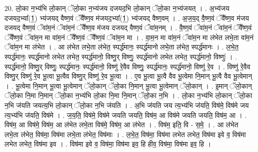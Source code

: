 \documentclass[17pt]{extarticle}
\begin{document}
20. लो॒का न॒भ्य॑भि लो॒कान् ॅलो॒का न॒भ्य॑जय दजयद॒भि लो॒कान् ॅलो॒का न॒भ्य॑जयत् । . अ॒भ्य॑जय दजयद॒भ्या᳚(1॒) भ्य॑जयद् वैष्ण॒वं ॅवै᳚ष्ण॒व म॑जयद॒भ्या᳚(1॒) भ्य॑जयद् वैष्ण॒वम् । . अ॒ज॒य॒द् वै॒ष्ण॒वं ॅवै᳚ष्ण॒व म॑जय दजयद् वैष्ण॒वं ॅवा॑म॒नं ॅवा॑म॒नं ॅवै᳚ष्ण॒व म॑जय दजयद् वैष्ण॒वं ॅवा॑म॒नम् । . वै॒ष्ण॒वं ॅवा॑म॒नं ॅवा॑म॒नं ॅवै᳚ष्ण॒वं ॅवै᳚ष्ण॒वं ॅवा॑म॒न मा वा॑म॒नं ॅवै᳚ष्ण॒वं ॅवै᳚ष्ण॒वं ॅवा॑म॒न मा । . वा॒म॒न मा वा॑म॒नं ॅवा॑म॒न मा ल॑भेत लभे॒ता वा॑म॒नं ॅवा॑म॒न मा ल॑भेत । . आ ल॑भेत लभे॒ता ल॑भेत॒ स्पर्द्ध॑मानः॒ स्पर्द्ध॑मानो लभे॒ता ल॑भेत॒ स्पर्द्ध॑मानः । . ल॒भे॒त॒ स्पर्द्ध॑मानः॒ स्पर्द्ध॑मानो लभेत लभेत॒ स्पर्द्ध॑मानो॒ विष्णु॒र् विष्णुः॒ स्पर्द्ध॑मानो लभेत लभेत॒ स्पर्द्ध॑मानो॒ विष्णुः॑ । . स्पर्द्ध॑मानो॒ विष्णु॒र् विष्णुः॒ स्पर्द्ध॑मानः॒ स्पर्द्ध॑मानो॒ विष्णु॑ रे॒वैव विष्णुः॒ स्पर्द्ध॑मानः॒ स्पर्द्ध॑मानो॒ विष्णु॑ रे॒व । . विष्णु॑ रे॒वैव विष्णु॒र् विष्णु॑ रे॒व भू॒त्वा भू॒त्वैव विष्णु॒र् विष्णु॑ रे॒व भू॒त्वा । . ए॒व भू॒त्वा भू॒त्वै वैव भू॒त्वेमा नि॒मान् भू॒त्वै वैव भू॒त्वेमान् । . भू॒त्वेमा नि॒मान् भू॒त्वा भू॒त्वेमान् ॅलो॒कान् ॅलो॒का नि॒मान् भू॒त्वा भू॒त्वेमान् ॅलो॒कान् । . इ॒मान् ॅलो॒कान् ॅलो॒का नि॒मा नि॒मान् ॅलो॒का न॒भ्य॑भि लो॒का नि॒मा नि॒मान् ॅलो॒का न॒भि । . लो॒का न॒भ्य॑भि लो॒कान् ॅलो॒का न॒भि ज॑यति जयत्य॒भि लो॒कान् ॅलो॒का न॒भि ज॑यति । . अ॒भि ज॑यति जय त्य॒भ्य॑भि ज॑यति॒ विष॑मे॒ विष॑मे जय त्य॒भ्य॑भि ज॑यति॒ विष॑मे । . ज॒य॒ति॒ विष॑मे॒ विष॑मे जयति जयति॒ विष॑म॒ आ विष॑मे जयति जयति॒ विष॑म॒ आ । . विष॑म॒ आ विष॑मे॒ विष॑म॒ आ ल॑भेत लभे॒ता विष॑मे॒ विष॑म॒ आ ल॑भेत । . विष॑म॒ इति॒ वि - स॒मे॒ । . आ ल॑भेत लभे॒ता ल॑भेत॒ विष॑मा॒ विष॑मा लभे॒ता ल॑भेत॒ विष॑माः । . ल॒भे॒त॒ विष॑मा॒ विष॑मा लभेत लभेत॒ विष॑मा इवे व॒ विष॑मा लभेत लभेत॒ विष॑मा इव । . विष॑मा इवे व॒ विष॑मा॒ विष॑मा इव॒ हि हीव॒ विष॑मा॒ विष॑मा इव॒ हि । \newline
\end{document}
